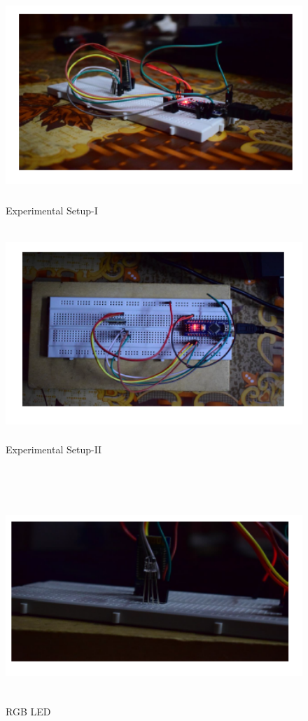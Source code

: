 \begin{figure}[H]
	
	\centering
	\includegraphics[width=\linewidth,height=8cm] {./images/p15.png}
	\caption{Experimental Setup-I}
	\label{manual}
\end{figure}

\begin{figure}[H]
	
	\centering
	\includegraphics[width=\linewidth,height=8cm] {./images/p16.png}
	\caption{Experimental Setup-II}
	\label{manual}
\end{figure}\\

\begin{figure}[H]
	
	\centering
	\includegraphics[width=\linewidth,height=8cm] {./images/p17.png}
	\caption{RGB LED}
	\label{manual}
\end{figure}

